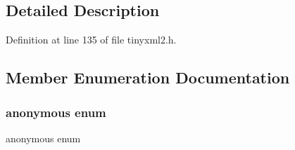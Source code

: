 \subsection{Detailed Description}


Definition at line 135 of file tinyxml2.\+h.



\subsection{Member Enumeration Documentation}
\mbox{\label{classtinyxml2_1_1_str_pair_a0301ef962e15dd94574431f1c61266c5}} 
\subsubsection{anonymous enum}
{\footnotesize\ttfamily anonymous enum}

